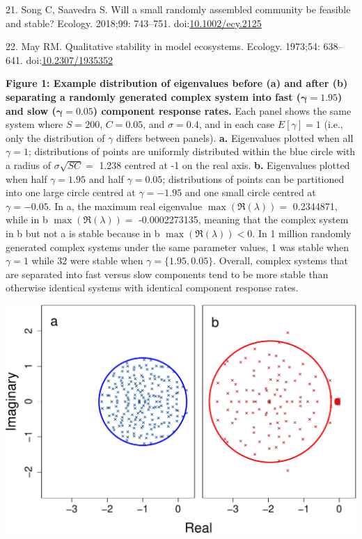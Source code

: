 \documentclass[]{article}
\begin{document}
\hypertarget{ref-Song2018}{}
21. Song C, Saavedra S. Will a small randomly assembled community be
feasible and stable? Ecology. 2018;99: 743--751.
doi:\href{https://doi.org/10.1002/ecy.2125}{10.1002/ecy.2125}

\hypertarget{ref-May1973}{}
22. May RM. Qualitative stability in model ecosystems. Ecology. 1973;54:
638--641. doi:\href{https://doi.org/10.2307/1935352}{10.2307/1935352}

\clearpage

\textbf{Figure 1: Example distribution of eigenvalues before (a) and
after (b) separating a randomly generated complex system into fast
(\(\boldsymbol{\gamma} = 1.95\)) and slow
(\(\boldsymbol{\gamma} = 0.05\)) component response rates.} Each panel
shows the same system where \(S = 200\), \(C = 0.05\), and
\(\sigma = 0.4\), and in each case \(E[\gamma] = 1\) (i.e., only the
distribution of \(\gamma\) differs between panels). \textbf{a.}
Eigenvalues plotted when all \(\gamma = 1\); distributions of points are
uniformly distributed within the blue circle with a radius of
\(\sigma\sqrt{SC} =\) 1.238 centred at -1 on the real axis. \textbf{b.}
Eigenvalues plotted when half \(\gamma = 1.95\) and half
\(\gamma = 0.05\); distributions of points can be partitioned into one
large circle centred at \(\gamma = -1.95\) and one small circle centred
at \(\gamma = -0.05\). In a, the maximum real eigenvalue
\(\max\left(\Re(\lambda)\right) =\) 0.2344871, while in b
\(\max\left(\Re(\lambda)\right) =\) -0.0002273135, meaning that the
complex system in b but not a is stable because in b
\(\max\left(\Re(\lambda)\right) < 0\). In 1 million randomly generated
complex systems under the same parameter values, 1 was stable when
\(\gamma = 1\) while 32 were stable when \(\gamma = \{1.95, 0.05\}\).
Overall, complex systems that are separated into fast versus slow
components tend to be more stable than otherwise identical systems with
identical component response rates.

\includegraphics{ms_files/figure-latex/unnamed-chunk-10-1.pdf}
\end{document}
